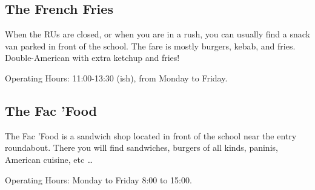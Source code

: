 

\subsection{The French Fries}
When the RUs are closed, or when you are in a rush, you can usually find a snack van parked in front of the school. The fare is mostly burgers, kebab, and fries.
Double-American with extra ketchup and fries!

Operating Hours: 11:00-13:30 (ish), from Monday to Friday.




\subsection{The Fac 'Food}

The Fac 'Food is a sandwich shop located in front of the school near the entry roundabout. There you will find sandwiches, burgers of all kinds, paninis, American cuisine, etc \dots

Operating Hours: Monday to Friday 8:00 to 15:00.






